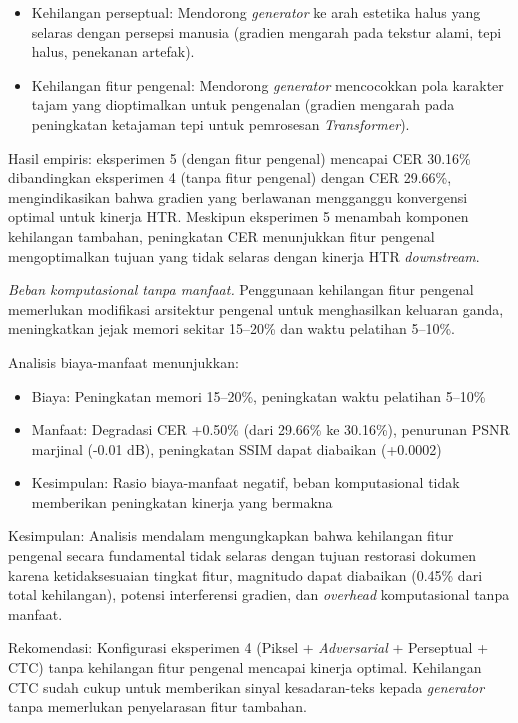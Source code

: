 \documentclass[journal]{IEEEtran}
\begin{document}
\begin{itemize}
    \item Kehilangan perseptual: Mendorong \textit{generator} ke arah estetika halus yang selaras dengan persepsi manusia (gradien mengarah pada tekstur alami, tepi halus, penekanan artefak).
    
    \item Kehilangan fitur pengenal: Mendorong \textit{generator} mencocokkan pola karakter tajam yang dioptimalkan untuk pengenalan (gradien mengarah pada peningkatan ketajaman tepi untuk pemrosesan \textit{Transformer}).
\end{itemize}

Hasil empiris: eksperimen 5 (dengan fitur pengenal) mencapai CER 30.16\% dibandingkan eksperimen 4 (tanpa fitur pengenal) dengan CER 29.66\%, mengindikasikan bahwa gradien yang berlawanan mengganggu konvergensi optimal untuk kinerja HTR. Meskipun eksperimen 5 menambah komponen kehilangan tambahan, peningkatan CER menunjukkan fitur pengenal mengoptimalkan tujuan yang tidak selaras dengan kinerja HTR \textit{downstream}.

\textit{Beban komputasional tanpa manfaat.} Penggunaan kehilangan fitur pengenal memerlukan modifikasi arsitektur pengenal untuk menghasilkan keluaran ganda, meningkatkan jejak memori sekitar 15--20\% dan waktu pelatihan 5--10\%.

Analisis biaya-manfaat menunjukkan:
\begin{itemize}
    \item Biaya: Peningkatan memori 15--20\%, peningkatan waktu pelatihan 5--10\%
    \item Manfaat: Degradasi CER +0.50\% (dari 29.66\% ke 30.16\%), penurunan PSNR marjinal (-0.01 dB), peningkatan SSIM dapat diabaikan (+0.0002)
    \item Kesimpulan: Rasio biaya-manfaat negatif, beban komputasional tidak memberikan peningkatan kinerja yang bermakna
\end{itemize}

Kesimpulan: Analisis mendalam mengungkapkan bahwa kehilangan fitur pengenal secara fundamental tidak selaras dengan tujuan restorasi dokumen karena ketidaksesuaian tingkat fitur, magnitudo dapat diabaikan (0.45\% dari total kehilangan), potensi interferensi gradien, dan \textit{overhead} komputasional tanpa manfaat.

Rekomendasi: Konfigurasi eksperimen 4 (Piksel + \textit{Adversarial} + Perseptual + CTC) tanpa kehilangan fitur pengenal mencapai kinerja optimal. Kehilangan CTC sudah cukup untuk memberikan sinyal kesadaran-teks kepada \textit{generator} tanpa memerlukan penyelarasan fitur tambahan.
\end{document}
